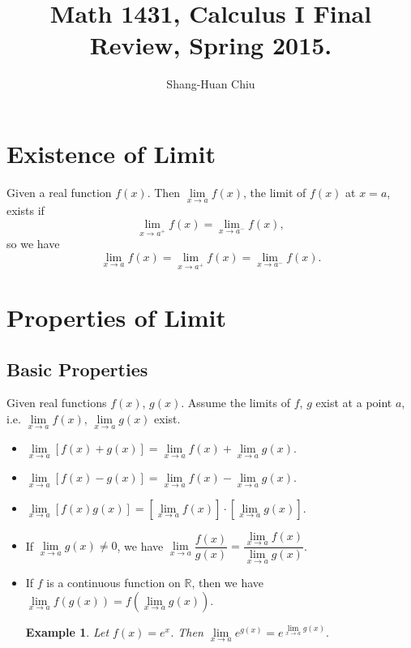 \documentclass[12pt]{article}
\newtheorem{example}[theorem]{Example}
\newcommand{\Rdb}{\mbox{$\mathbb{R}$}}
\begin{document}
\title{\Large Math 1431, Calculus I Final Review, Spring 2015.}
\author{ Shang-Huan Chiu }

\maketitle



\section{Existence of Limit}
Given a real function $f(x)$. Then $\lim\limits_{x\to a} f(x)$, the limit of $f(x)$ at $x=a$, exists if 
$$ \lim\limits_{x\to a^+} f(x) =\lim\limits_{x\to a^-} f(x),$$ so we have
$$\lim\limits_{x\to a} f(x) = \lim\limits_{x\to a^+} f(x) =\lim\limits_{x\to a^-} f(x).$$

\section{Properties of Limit}
\subsection{Basic Properties}

Given real functions $f(x)$, $g(x)$. 
Assume the limits of $f$, $g$ exist at a point $a$, 
i.e. $\lim\limits_{x\to a} f(x)$, $\lim\limits_{x\to a} g(x)$ exist.
\begin{itemize}
\item $\lim\limits_{x\to a}[ f(x) +g(x)] =\lim\limits_{x\to a} f(x) +\lim\limits_{x\to a} g(x)$.
 
\item $\lim\limits_{x\to a}[ f(x)-g(x)] =\lim\limits_{x\to a} f(x)-\lim\limits_{x\to a} g(x)$.

\item $\lim\limits_{x\to a} [f(x)g(x)] = [\lim\limits_{x\to a} f(x)] \cdot [\lim\limits_{x\to a} g(x)].$

\item If $\lim\limits_{x\to a} g(x) \neq 0$, we have $\lim\limits_{x\to a} \dfrac{f(x)}{g(x)} = \dfrac{\lim\limits_{x\to a} f(x)}{\lim\limits_{x\to a} g(x)}$.

\item If $f$ is a continuous function on $\Rdb$, then we have 
$\lim\limits_{x\to a} f({g(x)})= f({\lim\limits_{x\to a} g(x)}).$

\begin{example}
Let $f(x) = e^x$. Then $\lim\limits_{x\to a} e^{g(x)}= e^{\lim\limits_{x\to a} g(x)}.$
\end{example}
\end{itemize}
\end{document}
